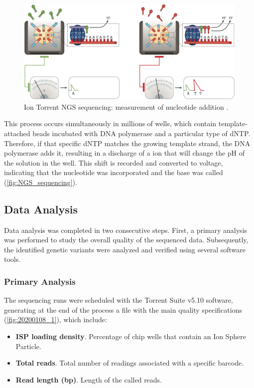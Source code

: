 \begin{figure}[ht]
    \centering
    \includegraphics[width=\textwidth]{Images/chapter_3/NGS_sequencing.png}
    \caption{Ion Torrent NGS sequencing: measurement of nucleotide addition \cite{NGS}.}
    \label{fig:NGS_sequencing}
\end{figure}

This process occurs simultaneously in millions of wells, which contain template-attached beads incubated with DNA polymerase and a particular type of dNTP. Therefore, if that specific dNTP matches the growing template strand, the DNA polymerase adds it, resulting in a discharge of a  ion that will change the pH of the solution in the well. This shift is recorded and converted to voltage, indicating that the nucleotide was incorporated and the base was called (\autoref{fig:NGS_sequencing}).

\subsection{Data Analysis}

Data analysis was completed in two consecutive steps. First, a primary analysis was performed to study the overall quality of the sequenced data. Subsequently, the identified genetic variants were analyzed and verified using several software tools.

\subsubsection{Primary Analysis}

The sequencing runs were scheduled with the Torrent Suite\texttrademark{} v5.10 software, generating at the end of the process a file with the main quality specifications (\autoref{fig:20200108_1}), which include:
\begin{itemize}
    \item \textbf{ISP loading density}. Percentage of chip wells that contain an Ion Sphere\texttrademark{} Particle.
    \item \textbf{Total reads}. Total number of readings associated with a specific barcode.
    \item \textbf{Read length (bp)}. Length of the called reads.
\end{itemize}


